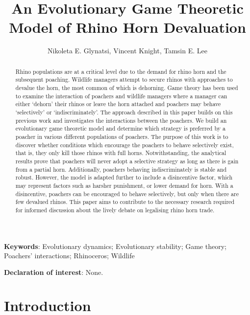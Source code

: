 \documentclass[10pt]{article}
\title{An Evolutionary Game Theoretic Model of Rhino Horn Devaluation}
\author{Nikoleta E. Glynatsi, Vincent Knight, Tamsin E. Lee} %
\date{}
\begin{document}
\maketitle

\bigskip
\textbf{Keywords}: Evolutionary dynamics; Evolutionary stability; Game theory; \\
\indent Poachers' interactions; Rhinoceros; Wildlife

\bigskip

\textbf{Declaration of interest}: None.

\newpage
\linenumbers{}
\begin{abstract}

Rhino populations are at a critical level due to the demand for rhino horn and
the subsequent poaching. Wildlife managers attempt to secure rhinos with
approaches to devalue the horn, the most common of which is dehorning. Game theory
has been used to examine the interaction of poachers and wildlife managers where
a manager can either `dehorn' their rhinos or leave the horn attached and poachers
may behave `selectively' or `indiscriminately'. The approach described in this paper
builds on this previous
work and investigates the interactions between the poachers. We build an evolutionary
game theoretic model and determine which strategy is preferred by a poacher in various
different populations of poachers. The purpose of this work is to discover whether
conditions which encourage the poachers to behave selectively exist, that is,
they only kill those rhinos with full horns. Notwithstanding, the analytical
results prove that poachers will never adopt a selective strategy as long as
there is gain from a partial horn. Additionally, poachers behaving indiscriminately
is stable and robust. However, the model is adapted further to include a
disincentive factor, which may represent factors such as harsher punishment, or
lower demand for horn. With a disincentive, poachers can be encouraged to behave
selectively, but only when there are few devalued rhinos. This paper aims to
contribute to the necessary research required for informed discussion about the
lively debate on legalising rhino horn trade.

\end{abstract}

\section{Introduction}\label{section:introduction}
\end{document}

